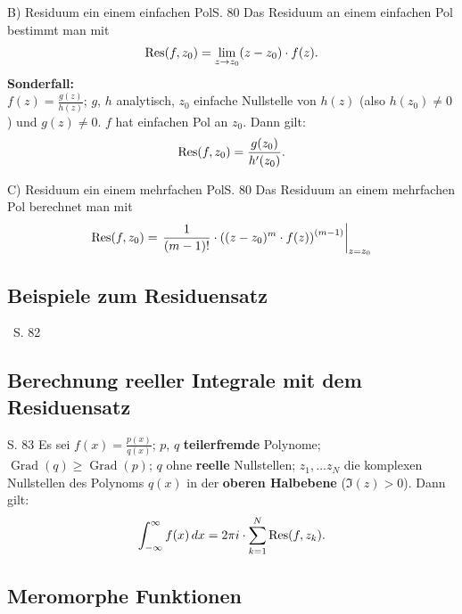 \begin{bemerkung}{B) Residuum ein einem einfachen Pol}{S. 80}
  Das Residuum an einem einfachen Pol bestimmt man mit
  \begin{align}
    \operatorname{Res}(f, z_0) = \lim_{z \to z_0} (z-z_0) \cdot f(z) .
  \end{align}
  \textbf{Sonderfall:}\\
  $f(z) = \frac{g(z)}{h(z)}$; $g$, $h$ analytisch, $z_0$ einfache Nullstelle von $h(z)$ (also $h(z_0) \neq 0$) und $g(z) \neq 0$.
  $f$ hat einfachen Pol an $z_0$.
  Dann gilt:
  \begin{align}
    \operatorname{Res}(f, z_0) = \frac{g(z_0)}{h'(z_0)} .
  \end{align}
\end{bemerkung}

\begin{bemerkung}{C) Residuum ein einem mehrfachen Pol}{S. 80}
  Das Residuum an einem mehrfachen Pol berechnet man mit
  \begin{align}
    \operatorname{Res}(f, z_0) = \left. \frac{1}{(m-1)!} \cdot \left( (z-z_0)^m \cdot f(z) \right)^{(m-1)} \right\vert_{z=z_0}
  \end{align}
\end{bemerkung}



\subsection{Beispiele zum Residuensatz}
\ S. 82



\subsection{Berechnung reeller Integrale mit dem Residuensatz}

\begin{satz}[]{S. 83}
  \label{satz:8_2}
  Es sei $f(x) = \frac{p(x)}{q(x)}$; $p$, $q$ \textbf{teilerfremde} Polynome; $\operatorname{Grad}(q) \geq \operatorname{Grad}(p)$; $q$ ohne \textbf{reelle} Nullstellen; $z_1, \dots z_N$ die komplexen Nullstellen des Polynoms $q(x)$ in der \textbf{oberen Halbebene} ($\Im(z)>0$).
  Dann gilt:
  \begin{align}
    \int_{-\infty}^{\infty} f(x) \, dx = 2 \pi i \cdot \sum_{k=1}^N \operatorname{Res}(f, z_k) .
  \end{align}
\end{satz}



\subsection{Meromorphe Funktionen}

